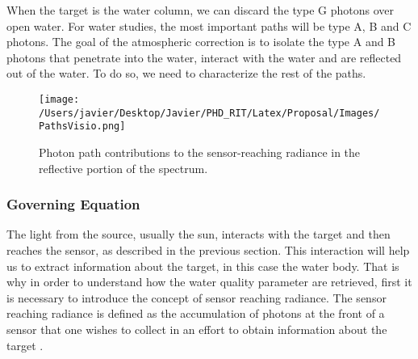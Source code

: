 When the target is the water column, we can discard the type G photons over open water. For water studies, the most important paths will be type A, B and C photons. The goal of the atmospheric correction is to isolate the type A and B photons that penetrate into the water, interact with the water and are reflected out of the water. To do so, we need to characterize the rest of the paths.

\begin{figure}[htb]
  \centering
  \texttt{[image: /Users/javier/Desktop/Javier/PHD\_RIT/Latex/Proposal/Images/PathsVisio.png]}
\caption{Photon path contributions to the sensor-reaching radiance in the reflective portion of the spectrum.}
\label{fig:paths} 
\end{figure}

\subsubsection{Governing Equation}

The light from the source, usually the sun, interacts with the target and then reaches the sensor, as described in the previous section. This interaction will help us to extract information about the target, in this case the water body. That is why in order to understand how the water quality parameter are retrieved, first it is necessary to introduce the concept of sensor reaching radiance. The sensor reaching radiance is defined as the accumulation of photons at the front of a sensor that one wishes to collect in an effort to obtain information about the target \citep{GeraceThesis}. 

